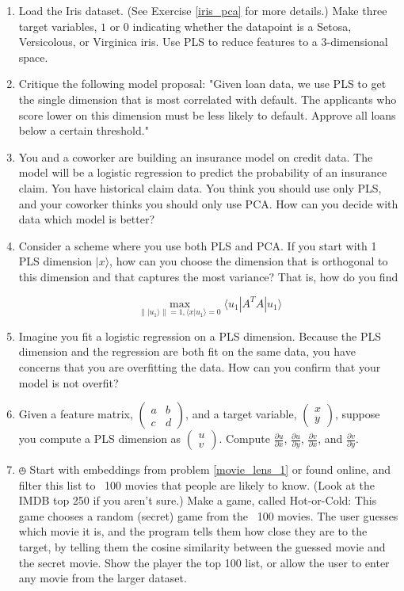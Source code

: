 \documentclass{amsbook}
\begin{document}
\begin{enumerate}
\item \label{iris_pls} Load the Iris dataset.  (See Exercise \ref{iris_pca} for more details.)  Make three target variables, $1$ or $0$ indicating whether the datapoint is a Setosa, Versicolous, or Virginica iris.  Use PLS to reduce features to a $3$-dimensional space.
\item Critique the following model proposal:  "Given loan data, we use PLS to get the single dimension that is most correlated with default.  The applicants who score lower on this dimension must be less likely to default.  Approve all loans below a certain threshold."
\item You and a coworker are building an insurance model on credit data.  The model will be a logistic regression to predict the probability of an insurance claim.  You have historical claim data.  You think you should use only PLS, and your coworker thinks you should only use PCA.  How can you decide with data which model is better?
\item \label{pls_pca_ex} Consider a scheme where you use both PLS and PCA.  If you start with 1 PLS dimension $|x\rangle$, how can you choose the dimension that is orthogonal to this dimension and that captures the most variance?  That is, how do you find

$$
\max_{\left\||u_1\rangle\right\|=1, \langle x|u_1\rangle=0}\langle u_1|A^TA|u_1\rangle
$$
\item Imagine you fit a logistic regression on a PLS dimension.  Because the PLS dimension and the regression are both fit on the same data, you have concerns that you are overfitting the data.  How can you confirm that your model is not overfit?
\item Given a feature matrix, $\left(\begin{array}{cc}a&b\\c&d\end{array}\right)$, and a target variable, $\left(\begin{array}{c}x\\y\end{array}\right)$, suppose you compute a PLS dimension as $\left(\begin{array}{c}u\\v\end{array}\right)$.  Compute $\frac{\partial u}{\partial x}$, $\frac{\partial u}{\partial y}$, $\frac{\partial v}{\partial x}$, and $\frac{\partial v}{\partial y}$.
\item $\obot$ Start with embeddings from problem \ref{movie_lens_1} or found online, and filter this list to ~100 movies that people are likely to know.  (Look at the IMDB top 250 if you aren’t sure.)  Make a game, called Hot-or-Cold:  This game chooses a random (secret) game from the ~100 movies.  The user guesses which movie it is, and the program tells them how close they are to the target, by telling them the cosine similarity between the guessed movie and the secret movie.  Show the player the top 100 list, or allow the user to enter any movie from the larger dataset.
\end{enumerate}
\end{document}
